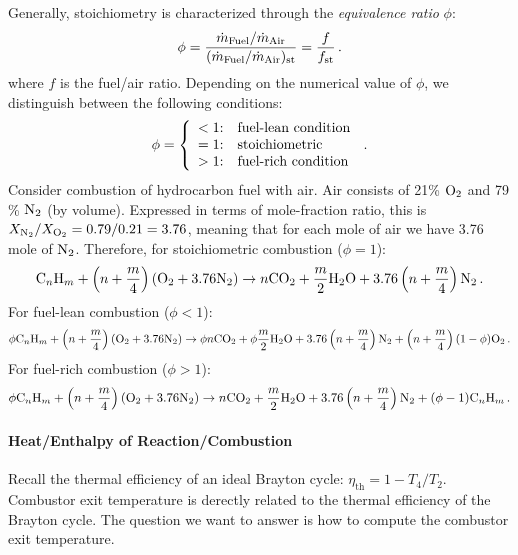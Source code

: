 Generally, stoichiometry is characterized through the {\it equivalence ratio} $\phi$:
\begin{equation}
  \phi = {\frac{\dot{m}_{\rm{Fuel}}/\dot{m}_{\rm{Air}}}{(\dot{m}_{\rm{Fuel}}/\dot{m}_{\rm{Air}})_{\rm{st}}}} = {\frac{f}{f_\text{st}}}\,.
\end{equation}
where $f$ is the fuel/air ratio. Depending on the numerical value of $\phi$, we distinguish between the following conditions:
\begin{equation}
  \phi = \left\{ 
         \begin{array}{r@{:\quad}l}
          <1 & {\text{fuel-lean condition}}\\
          =1 & {\text{stoichiometric}}\\
          >1 & {\text{fuel-rich condition}}\\
         \end{array}
         \right. \,.
\end{equation}
Consider combustion of hydrocarbon fuel with air. Air consists of 21\% $\mathrm{O_2}$ and 79 \% $\mathrm{N_2}$ (by volume). Expressed in terms of mole-fraction ratio, this is $X_{\mathrm{N_2}} / X_{\mathrm{O_2}} = 0.79 / 0.21 = 3.76$, meaning that for each mole of air we have 3.76 mole of $\mathrm{N_2}$. Therefore, for stoichiometric combustion ($\phi = 1$):
\[
  \mathrm{C}_n\mathrm{H}_m + \left(n+{\frac{m}{4}}\right)(\mathrm{O_2}+3.76\mathrm{N_2}) \rightarrow n\mathrm{CO_2} + {\frac{m}{2}}\mathrm{H_2O} + 3.76\left(n+{\frac{m}{4}}\right)\mathrm{N_2} \, \text{.}
\]
For fuel-lean combustion ($\phi < 1$):
\[
\begin{split}
  \phi \mathrm{C}_n\mathrm{H}_m + \left(n+{\frac{m}{4}}\right)(\mathrm{O_2}+3.76\mathrm{N_2}) \rightarrow \phi n\mathrm{CO_2} + \phi {\frac{m}{2}}\mathrm{H_2O} + 3.76\left(n+{\frac{m}{4}}\right)\mathrm{N_2}
   + \left(n+{\frac{m}{4}}\right) (1- \phi) \mathrm{O_2} \, \text{.}
\end{split}
\]
For fuel-rich combustion ($\phi > 1$):
\[
\begin{split}
  \phi \mathrm{C}_n\mathrm{H}_m + \left(n+{\frac{m}{4}}\right)(\mathrm{O_2}+3.76\mathrm{N_2}) \rightarrow n\mathrm{CO_2} + {\frac{m}{2}}\mathrm{H_2O} + 3.76\left(n+{\frac{m}{4}}\right)\mathrm{N_2} + (\phi-1) \mathrm{C}_n\mathrm{H}_m \, \text{.}
\end{split}
\]

\paragraph{Heat/Enthalpy of Reaction/Combustion}
Recall the thermal efficiency of an ideal Brayton cycle: $\eta_\text{th} = 1- T_4/ T_2$. Combustor exit temperature is derectly related to the thermal efficiency of the Brayton cycle. The question we want to answer is how to compute the combustor exit temperature.

